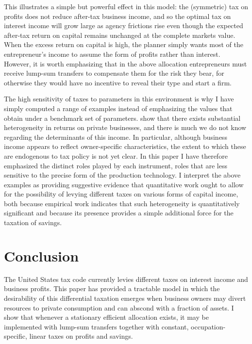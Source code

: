 \documentclass[11pt]{article}
\theoremstyle{plain}
\theoremstyle{definition} %
\begin{document}
This illustrates a simple but powerful effect in this model: the (symmetric) tax on profits does not reduce after-tax business income, and so the optimal tax on interest income will grow large as agency frictions rise even though the expected after-tax return on capital remains unchanged at the complete markets value. When the excess return on capital is high, the planner simply wants most of the entrepreneur's income to assume the form of profits rather than interest. However, it is worth emphasizing that in the above allocation entrepreneurs must receive lump-sum transfers to compensate them for the risk they bear, for otherwise they would have no incentive to reveal their type and start a firm.  

The high sensitivity of taxes to parameters in this environment is why I have simply computed a range of examples instead of emphasizing the values that obtain under a benchmark set of parameters. \cite{smith_capitalists_2019} show that there exists substantial heterogeneity in returns on private businesses, and there is much we do not know regarding the determinants of this income. In particular, although business income appears to reflect owner-specific characteristics, the extent to which these are endogenous to tax policy is not yet clear. In this paper I have therefore emphasized the distinct roles played by each instrument, roles that are less sensitive to the precise form of the production technology. I interpret the above examples as providing suggestive evidence that quantitative work ought to allow for the possibility of levying different taxes on various forms of capital income, both because empirical work indicates that such heterogeneity is quantitatively significant and because its presence provides a simple additional force for the taxation of savings. 


\section{Conclusion} \label{conc}

The United States tax code currently levies different taxes on interest income and business profits. This paper has provided a tractable model in which the desirability of this differential taxation emerges when business owners may divert resources to private consumption and can abscond with a fraction of assets. I show that whenever a stationary efficient allocation exists, it may be implemented with lump-sum transfers together with constant, occupation-specific, linear taxes on profits and savings. 
\end{document}

